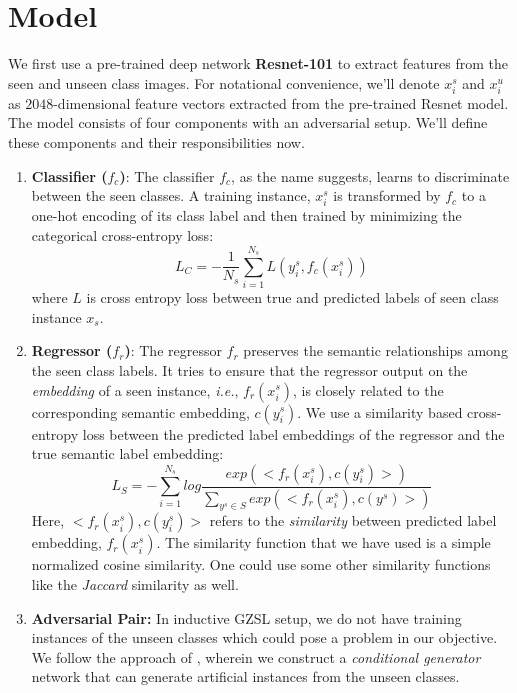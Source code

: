 \documentclass{article}
\begin{document}
\section{Model}
\label{model}
We first use a pre-trained deep network \textbf{Resnet-101} to extract features from the seen and unseen class images. For notational convenience, we'll denote $x_i^s$ and $x_i^u$ as $2048$-dimensional feature vectors extracted from the pre-trained Resnet model.
The model consists of four components with an adversarial setup. We'll define these components and their responsibilities now.

\begin{enumerate}
	\item \textbf{Classifier ($f_c$)}: The classifier $f_c$, as the name suggests, learns to discriminate between the seen classes. 
	A training instance, $x_i^s$ is transformed by $f_c$ to a one-hot encoding of its class label and then trained by minimizing the categorical cross-entropy loss:
	\begin{equation}
		L_C = - \frac{1}{N_s} \sum_{i=1}^{N_s}{L(y_i^s, f_c(x_i^s))}
	\end{equation}
	where $L$ is cross entropy loss between true and predicted labels of seen class instance $x_s$.
	
	\item \textbf{Regressor ($f_r$)}: The regressor $f_r$ preserves the semantic relationships among the seen class labels.
	It tries to ensure that the regressor output on the \textit{embedding} of a seen instance, \textit{i.e.}, $f_r(x_i^s)$, is closely related to the corresponding semantic embedding, $c(y_i^s)$. We use a similarity based cross-entropy loss between the predicted label embeddings of the regressor and the true semantic label embedding:
	\begin{equation}
		L_S = - \sum_{i=1}^{N_s} log \frac{exp(<f_r(x_i^s), c(y_i^s)>)}{\sum_{y^s \in S} exp(<f_r(x_i^s), c(y^s)>)}
	\end{equation}
	Here, $<f_r(x_i^s), c(y_i^s)>$ refers to the \textit{similarity} between predicted label embedding, $f_r(x_i^s)$. The similarity function that we have used is a simple normalized cosine similarity. One could use some other similarity functions like the \textit{Jaccard} similarity as well.

	\item \textbf{Adversarial Pair:} 
	In inductive GZSL setup, we do not have training instances of the unseen classes which could pose a problem in our objective. We follow the approach of \citet{sabr25}, wherein we construct a \textit{conditional generator} network that can generate artificial instances from the unseen classes. 


\end{enumerate}
\end{document}
